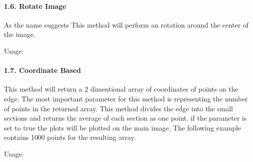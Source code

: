 \documentclass[letterpaper,10pt,english]{sphinxmanual}
\begin{document}


\paragraph{1.6. Rotate Image}
\label{\detokenize{tutorials:rotate-image}}
\sphinxAtStartPar
As the name suggests This method will perform an rotation around the center of the image.

\sphinxAtStartPar
Usage:

\begin{sphinxVerbatim}[commandchars=\\\{\}]
\end{sphinxVerbatim}


\paragraph{1.7. Coordinate Based}
\label{\detokenize{tutorials:coordinate-based}}
\sphinxAtStartPar
This method will return a 2 dimentional array of coordinates of points on the edge.
The most important parameter for this method is  representing the number of
points in the returned array. This method divides the edge into the small sections and
returns the average of each section as one point. if the parameter  is set to true
the plots will be plotted on the main image. The following example contains 1000 points for
the resulting array.

\sphinxAtStartPar
Usage:

\begin{sphinxVerbatim}[commandchars=\\\{\}]
\end{sphinxVerbatim}

\noindent{}
\end{document}
